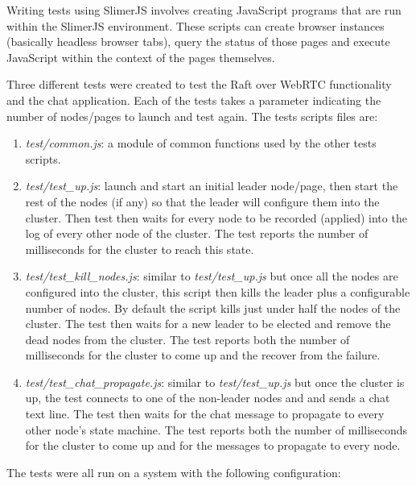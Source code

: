 \documentclass[9pt]{extarticle}
\begin{document}
\begin{multicols}{2}
Writing tests using SlimerJS involves creating JavaScript programs
that are run within the SlimerJS environment. These scripts can create
browser instances (basically headless browser tabs), query the status
of those pages and execute JavaScript within the context of the pages
themselves.

Three different tests were created to test the Raft over WebRTC
functionality and the chat application. Each of the tests takes
a parameter indicating the number of nodes/pages to launch and test
again. The tests scripts files are:

\begin{enumerate}
    \item \emph{test/common.js}: a module of common functions used by
        the other tests scripts.
    \item \emph{test/test\_up.js}: launch and start an initial leader
        node/page, then start the rest of the nodes (if any) so that
        the leader will configure them into the cluster. Then test
        then waits for every node to be recorded (applied) into the log
        of every other node of the cluster. The test reports the
        number of milliseconds for the cluster to reach this state.
    \item \emph{test/test\_kill\_nodes.js}: similar to
        \emph{test/test\_up.js} but once all the nodes are configured
        into the cluster, this script then kills the leader plus
        a configurable number of nodes. By default the script kills
        just under half the nodes of the cluster. The test then waits
        for a new leader to be elected and remove the dead nodes from
        the cluster. The test reports both the number of milliseconds
        for the cluster to come up and the recover from the failure.
    \item \emph{test/test\_chat\_propagate.js}: similar to
        \emph{test/test\_up.js} but once the cluster is up, the test
        connects to one of the non-leader nodes and and sends a chat
        text line. The test then waits for the chat message to
        propagate to every other node's state machine. The test
        reports both the number of milliseconds for the cluster to
        come up and for the messages to propagate to every node.
\end{enumerate}

The tests were all run on a system with the following configuration:


\end{multicols}
\end{document}
